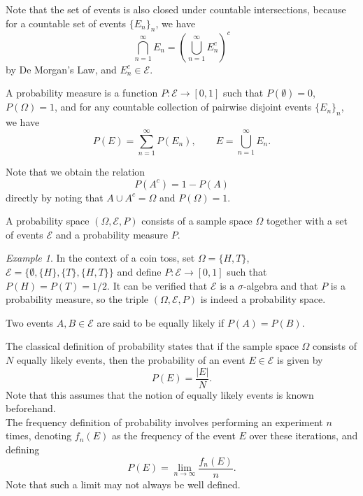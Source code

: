 \documentclass[11pt]{article}
\theoremstyle{definition}
\theoremstyle{remark}
\newtheorem*{example}{Example}
\numberwithin{equation}{module}
\begin{document}
    Note that the set of events is also closed under countable intersections,
    because for a countable set of events $\{E_n\}_n$, we have \[
        \bigcap_{n = 1}^\infty E_n = \left(\bigcup_{n = 1}^\infty E_n^c\right)^c
    \] by De Morgan's Law, and $E_n^c \in \mathcal{E}$.
    
    \begin{definition}[Probability]
        A probability measure is a function $P\colon \mathcal{E} \to [0, 1]$ such
        that $P(\emptyset) = 0$, $P(\Omega) = 1$, and for any countable collection of
        pairwise disjoint events $\{E_n\}_n$, we have \[
            P(E) = \sum_{n = 1}^\infty P(E_n), \qquad E = \bigcup_{n = 1}^\infty E_n.
        \] 
    \end{definition}

    Note that we obtain the relation \[
        P(A^c) = 1 - P(A)
    \] directly by noting that $A \cup A^c = \Omega$ and $P(\Omega) = 1$.

    \begin{definition}
        A probability space $(\Omega, \mathcal{E}, P)$ consists of a sample space
        $\Omega$ together with a set of events $\mathcal{E}$ and a probability
        measure $P$.
    \end{definition}
    \begin{example}
        In the context of a coin toss, set $\Omega = \{H, T\}$, $\mathcal{E} =
        \{\emptyset, \{H\}, \{T\}, \{H, T\}\}$ and define $P\colon \mathcal{E} \to
        [0, 1]$ such that $P(H) = P(T) = 1 /2$. It can be verified that
        $\mathcal{E}$ is a $\sigma$-algebra and that $P$ is a probability measure,
        so the triple $(\Omega, \mathcal{E}, P)$ is indeed a probability space.
    \end{example}

    \begin{definition}
        Two events $A, B \in \mathcal{E}$ are said to be equally likely if $P(A) =
        P(B)$.
    \end{definition}

    The classical definition of probability states that if the sample space
    $\Omega$ consists of $N$ equally likely events, then the probability of an
    event $E \in \mathcal{E}$ is given by \[
        P(E) = \frac{|E|}{N}.
    \] 
    Note that this assumes that the notion of equally likely events is known
    beforehand.\\

    The frequency definition of probability involves performing an experiment
    $n$ times, denoting $f_n(E)$ as the frequency of the event $E$ over these
    iterations, and defining \[
        P(E) = \lim_{n \to \infty} \frac{f_n(E)}{n}. 
    \] 
    Note that such a limit may not always be well defined.
    
\end{document}
